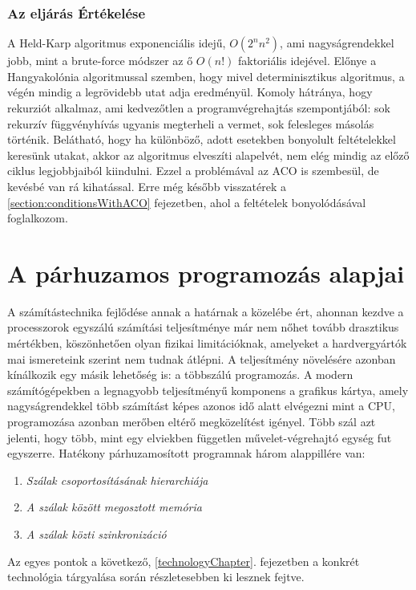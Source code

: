 \subsubsection{Az eljárás Értékelése}
\label{sssec:HeldKarpEvaluate}
A Held-Karp algoritmus exponenciális idejű, \(O(2^nn^2)\), ami nagyságrendekkel jobb, mint a brute-force módszer az ő \(O(n!)\) faktoriális idejével. Előnye a Hangyakolónia algoritmussal szemben, hogy mivel determinisztikus algoritmus, a végén mindig a legrövidebb utat adja eredményül. Komoly hátránya, hogy rekurziót alkalmaz, ami kedvezőtlen a programvégrehajtás szempontjából: sok rekurzív függvényhívás ugyanis megterheli a vermet, sok felesleges másolás történik. Belátható, hogy ha különböző, adott esetekben bonyolult feltételekkel keresünk utakat, akkor az algoritmus elveszíti alapelvét, nem elég mindig az előző ciklus legjobbjaiból kiindulni. Ezzel a problémával az ACO is szembesül, de kevésbé van rá kihatással. Erre még később visszatérek a \ref{section:conditionsWithACO} fejezetben, ahol a feltételek bonyolódásával foglalkozom.


\section{A párhuzamos programozás alapjai} \label{secParallelProgramming}

A számítástechnika fejlődése annak a határnak a közelébe ért, ahonnan kezdve a processzorok egyszálú számítási teljesítménye már nem nőhet tovább drasztikus mértékben, köszönhetően olyan fizikai limitációknak, amelyeket a hardvergyártók mai ismereteink szerint nem tudnak átlépni. A teljesítmény növelésére azonban kínálkozik egy másik lehetőség is: a többszálú programozás. A modern számítógépekben a legnagyobb teljesítményű komponens a grafikus kártya, amely nagyságrendekkel több számítást képes azonos idő alatt elvégezni mint a CPU, programozása azonban merőben eltérő megközelítést igényel. Több szál azt jelenti, hogy több, mint egy elviekben független művelet-végrehajtó egység fut egyszerre. Hatékony párhuzamosított programnak három alappillére van: \cite{kvantum_optim}
\begin{enumerate}
	\item \emph{Szálak csoportosításának hierarchiája}
	\item \emph{A szálak között megosztott memória}
	\item \emph{A szálak közti szinkronizáció}
\end{enumerate}

Az egyes pontok a következő, \ref{technologyChapter}. fejezetben a konkrét technológia tárgyalása során részletesebben ki lesznek fejtve.


